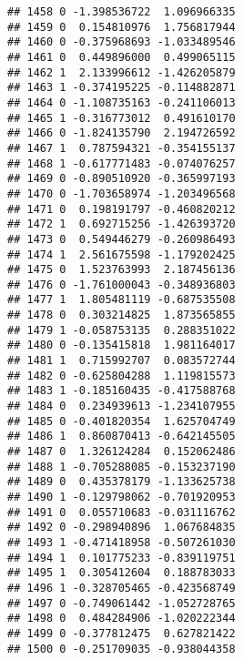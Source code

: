 \documentclass[
]{article}
\begin{document}
\begin{verbatim}
## 1458 0 -1.398536722  1.096966335
## 1459 0  0.154810976  1.756817944
## 1460 0 -0.375968693 -1.033489546
## 1461 0  0.449896000  0.499065115
## 1462 1  2.133996612 -1.426205879
## 1463 1 -0.374195225 -0.114882871
## 1464 0 -1.108735163 -0.241106013
## 1465 1 -0.316773012  0.491610170
## 1466 0 -1.824135790  2.194726592
## 1467 1  0.787594321 -0.354155137
## 1468 1 -0.617771483 -0.074076257
## 1469 0 -0.890510920 -0.365997193
## 1470 0 -1.703658974 -1.203496568
## 1471 0  0.198191797 -0.460820212
## 1472 1  0.692715256 -1.426393720
## 1473 0  0.549446279 -0.260986493
## 1474 1  2.561675598 -1.179202425
## 1475 0  1.523763993  2.187456136
## 1476 0 -1.761000043 -0.348936803
## 1477 1  1.805481119 -0.687535508
## 1478 0  0.303214825  1.873565855
## 1479 1 -0.058753135  0.288351022
## 1480 0 -0.135415818  1.981164017
## 1481 1  0.715992707  0.083572744
## 1482 0 -0.625804288  1.119815573
## 1483 1 -0.185160435 -0.417588768
## 1484 0  0.234939613 -1.234107955
## 1485 0 -0.401820354  1.625704749
## 1486 1  0.860870413 -0.642145505
## 1487 0  1.326124284  0.152062486
## 1488 1 -0.705288085 -0.153237190
## 1489 0  0.435378179 -1.133625738
## 1490 1 -0.129798062 -0.701920953
## 1491 0  0.055710683 -0.031116762
## 1492 0 -0.298940896  1.067684835
## 1493 1 -0.471418958 -0.507261030
## 1494 1  0.101775233 -0.839119751
## 1495 1  0.305412604  0.188783033
## 1496 1 -0.328705465 -0.423568749
## 1497 0 -0.749061442 -1.052728765
## 1498 0  0.484284906 -1.020222344
## 1499 0 -0.377812475  0.627821422
## 1500 0 -0.251709035 -0.938044358
\end{verbatim}
\end{document}
